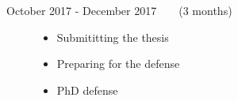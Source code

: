 \begin{description}
\begin{itemize}
	  \end{itemize}
\item[October 2017 - December 2017~~~~(3 months)] \hfill
\begin{itemize}
    	\item Submititting the thesis
    	\item Preparing for the defense
    	\item PhD defense
    	    
	  \end{itemize}
\end{description}


